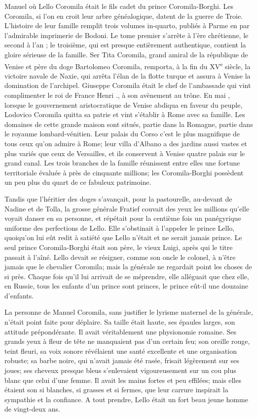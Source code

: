 Manuel où Lello Coromila était le fils cadet du prince Coromila-Borghi.
Les Coromila, si l'on en croit leur arbre généalogique, datent de la
guerre de Troie. L'histoire de leur famille remplit trois volumes
in-quarto, publiés à Parme en  par l'admirable imprimerie de Bodoni.
Le tome premier s'arrête à l'ère chrétienne, le second à l'an ; le
troisième, qui est presque entièrement authentique, contient la gloire
sérieuse de la famille. Ser Tita Coromila, grand amiral de la république
de Venise et père du doge Bartolomeo Coromila, remporta, à la fin du
XV\textsuperscript{e} siècle, la victoire navale de Naxie, qui arrêta
l'élan de la flotte turque et assura à Venise la domination de
l'archipel. Giuseppe Coromila était le chef de l'ambassade qui vint
complimenter le roi de France Henri ., à son avènement au trône. En mai
, lorsque le gouvernement aristocratique de Venise abdiqua en faveur
du peuple, Lodovico Coromila quitta sa patrie et vint s'établir à Rome
avec sa famille. Les domaines de cette grande maison sont situés, partie
dans la Romagne, partie dans le royaume lombard-vénitien. Leur palais du
Corso c'est le plus magnifique de tous ceux qu'on admire à Rome; leur
villa d'Albano a des jardins aussi vastes et plus variés que ceux de
Versailles, et ils conservent à Venise quatre palais sur le grand canal.
Les trois branches de la famille réunissent entre elles une fortune
territoriale évaluée à près de cinquante millions; les Coromila-Borghi
possèdent un peu plus du quart de ce fabuleux patrimoine.

Tandis que l'héritier des doges s'avançait, pour la pastourelle,
au-devant de Nadine et de Tolla, la grosse générale Fratief couvait des
yeux les millions qu'elle voyait danser en sa personne, et répétait pour
la centième fois un panégyrique uniforme des perfections de Lello. Elle
s'obstinait à l'appeler le prince Lello, quoiqu'on lui eût redit à
satiété que Lello n'était et ne serait jamais prince. Le seul prince
Coromila-Borghi était son père, le vieux Luigi, après qui le titre
passait à l'aîné. Lello devait se résigner, comme son oncle le colonel,
à n'être jamais que le chevalier Coromila; mais la générale ne regardait
point les choses de si près. Chaque fois qu'il lui arrivait de se
méprendre, elle alléguait que chez elle, en Russie, tous les enfants
d'un prince sont princes, le prince eût-il une douzaine d'enfants.

La personne de Manuel Coromila, sans justifier le lyrisme maternel de la
générale, n'était point faite pour déplaire. Sa taille était haute, ses
épaules larges, son attitude prépondérante. Il avait véritablement une
physionomie romaine. Ses grands yeux à fleur de tête ne manquaient pas
d'un certain feu; son oreille rouge, teint fleuri, sa voix sonore
révélaient une santé excellente et une organisation robuste; sa barbe
noire, qui n'avait jamais été rasée, frisait légèrement sur ses joues;
ses cheveux presque bleus s'enlevaient vigoureusement sur un cou plus
blanc que celui d'une femme. Il avait les mains fortes et peu effilées;
mais elles étaient son si blanches, si grasses et si fermes, que leur
carrure inspirait la sympathie et la confiance. A tout prendre, Lello
était un fort beau jeune homme de vingt-deux ans.

